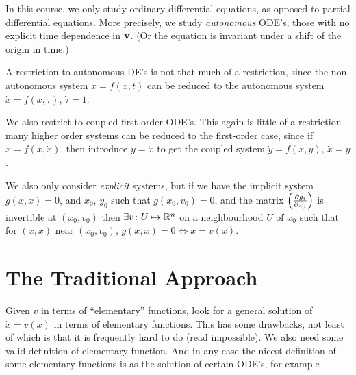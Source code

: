 \documentclass{notes}
\theoremstyle{plain}
\begin{document}
In this course, we only study ordinary differential equations, as
opposed to partial differential equations.  More precisely, we study
\emph{autonomous} ODE's, those with no explicit time dependence in
$\mathbf{v}$.  (Or the equation is invariant under a shift of the origin
in time.)

A restriction to autonomous DE's is not that much of a restriction,
since the non-autonomous system $\dot{x} = f(x,t)$ can be reduced to
the autonomous system $\dot{x} = f(x,\tau)$, $\dot{\tau} = 1$.

We also restrict to coupled first-order ODE's.  This again is little
of a restriction -- many higher order systems can be reduced to the
first-order case, since if $\ddot{x} = f(x,\dot{x})$, then introduce
$y = \dot{x}$ to get the coupled system $\dot{y} = f(x,y)$, $\dot{x} =
y$.

We also only consider \emph{explicit} systems, but if we have the
implicit system $g(x,\dot{x}) = 0$, and $x_0$, $y_0$ such that $g(x_0,
v_0) = 0$, and the matrix $\left( \frac{\partial g_i}{\partial \dot{x}_j} \right)$ is
invertible at $(x_0,v_0)$ then $\exists v \colon U \mapsto \mathbb{R}^n$ on a
neighbourhood $U$ of $x_0$ such that for $(x,\dot{x})$ near
$(x_0,v_0)$, $g(x,\dot{x})=0 \Leftrightarrow \dot{x} = v(x)$.

\section{The Traditional Approach}

Given $v$ in terms of ``elementary'' functions, look for a general
solution of $\dot{x} = v(x)$ in terms of elementary functions.  This
has some drawbacks, not least of which is that it is frequently hard
to do (read impossible).  We also need some valid definition of
elementary function.  And in any case the nicest definition of some
elementary functions is as the solution of certain ODE's, for example
\end{document}
